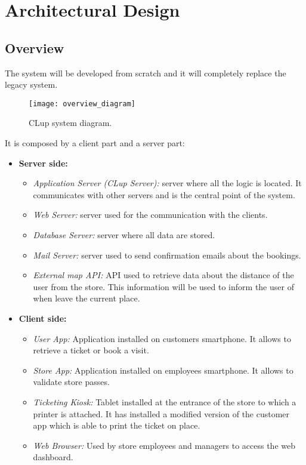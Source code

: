 \chapter{Architectural Design}

\section{Overview}
The system will be developed from scratch and it will completely replace the legacy system. \newline

\vspace{0.8em}
\begin{figure}[H]
	\centering
	\texttt{[image: overview\_diagram]}
	\caption{CLup system diagram.}
\end{figure}

It is composed by a client part and a server part:
\begin{itemize}
	\item \textbf{Server side:}
	\begin{itemize}
		\item \textit{Application Server (CLup Server):} server where all the logic is located. It communicates with other servers and is the central point of the system.
		\item \textit{Web Server:} server used for the communication with the clients.
		\item \textit{Database Server:} server where all data are stored.
		\item \textit{Mail Server:} server used to send confirmation emails about the bookings.
		\item \textit{External map API:} API used to retrieve data about the distance of the user from the store. This information will be used to inform the user of when leave the current place.
	\end{itemize}
	\item \textbf{Client side:}
	\begin{itemize}
		\item \textit{User App:} Application installed on customers smartphone. It allows to retrieve a ticket or book a visit.
		\item \textit{Store App:} Application installed on employees smartphone. It allows to validate store passes.
		\item \textit{Ticketing Kiosk:} Tablet installed at the entrance of the store to which a printer is attached. It has installed a modified version of the customer app which is able to print the ticket on place.
		\item \textit{Web Browser:} Used by store employees and managers to access the web dashboard.
	\end{itemize}
\end{itemize}

